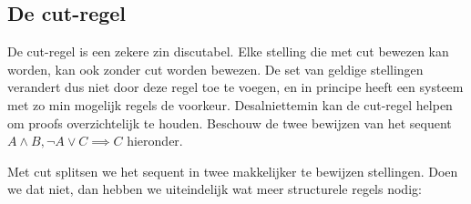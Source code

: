 
\subsection{De cut-regel}
De cut-regel is een zekere zin discutabel. Elke stelling die met cut bewezen kan worden, kan ook zonder cut worden bewezen. De set van geldige stellingen verandert dus niet door deze regel toe te voegen, en in principe heeft een systeem met zo min mogelijk regels de voorkeur. Desalniettemin kan de cut-regel helpen om proofs overzichtelijk te houden. Beschouw de twee bewijzen van het sequent $A \land B, \neg A \lor C \implies C$ hieronder.

\begin{prooftree}



\end{prooftree}

Met cut splitsen we het sequent in twee makkelijker te bewijzen stellingen. Doen we dat niet, dan hebben we uiteindelijk wat meer structurele regels nodig:

\begin{prooftree}

\end{prooftree}

